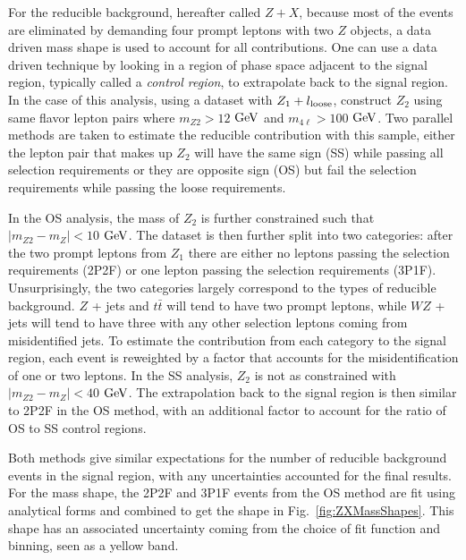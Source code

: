 For the reducible background, hereafter called $Z+X$, because most of the events are eliminated by demanding four prompt leptons with two $Z$ objects, a data driven mass shape is used to account for all contributions. One can use a data driven technique by looking in a region of phase space adjacent to the signal region, typically called a \textit{control region}, to extrapolate back to the signal region. In the case of this analysis, using a dataset with $Z_1 + l_{\rm{loose}}$, construct $Z_2$ using same flavor lepton pairs where $m_{Z2} > 12$ $\rm{GeV}$ and $m_{4\ell} > 100$ $\rm{GeV}$. Two parallel methods are taken to estimate the reducible contribution with this sample, either the lepton pair that makes up $Z_2$ will have the same sign (SS) while passing all selection requirements or they are opposite sign (OS) but fail the selection requirements while passing the loose requirements. 

In the OS analysis, the mass of $Z_2$ is further constrained such that $|m_{Z2}-m_Z|<10$ $\rm{GeV}$. The dataset is then further split into two categories: after the two prompt leptons from $Z_1$ there are either no leptons passing the selection requirements (2P2F) or one lepton passing the selection requirements (3P1F). Unsurprisingly, the two categories largely correspond to the types of reducible background. $Z$ + jets and $t\bar{t}$ will tend to have two prompt leptons, while $WZ$ + jets will tend to have three with any other selection leptons coming from misidentified jets. To estimate the contribution from each category to the signal region, each event is reweighted by a factor that accounts for the misidentification of one or two leptons. In the SS analysis, $Z_2$ is not as constrained with $|m_{Z2}-m_Z|<40$ $\rm{GeV}$. The extrapolation back to the signal region is then similar to 2P2F in the OS method, with an additional factor to account for the ratio of OS to SS control regions.

Both methods give similar expectations for the number of reducible background events in the signal region, with any uncertainties accounted for the final results. For the mass shape, the 2P2F and 3P1F events from the OS method are fit using analytical forms and combined to get the shape in Fig.~\ref{fig:ZXMassShapes}. This shape has an associated uncertainty coming from the choice of fit function and binning, seen as a yellow band.

